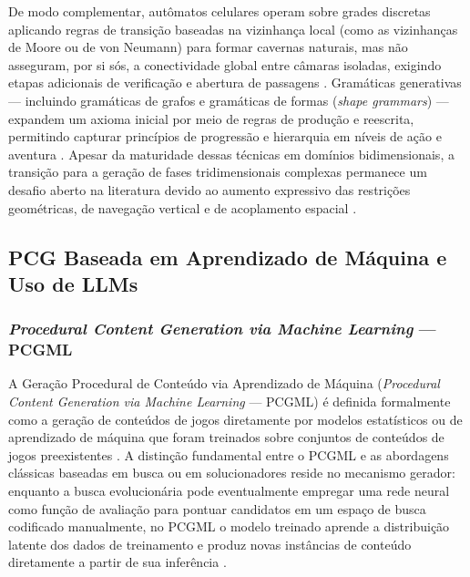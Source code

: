 De modo complementar, autômatos celulares operam sobre grades discretas aplicando regras de transição baseadas na vizinhança local (como as vizinhanças de Moore ou de von Neumann) para formar cavernas naturais, mas não asseguram, por si sós, a conectividade global entre câmaras isoladas, exigindo etapas adicionais de verificação e abertura de passagens \cite{linden2014dungeons, shaker2016constructive}. Gramáticas generativas --- incluindo gramáticas de grafos e gramáticas de formas (\textit{shape grammars}) --- expandem um axioma inicial por meio de regras de produção e reescrita, permitindo capturar princípios de progressão e hierarquia em níveis de ação e aventura \cite{dormans2010, inproceedings, shaker2016constructive}. Apesar da maturidade dessas técnicas em domínios bidimensionais, a transição para a geração de fases tridimensionais complexas permanece um desafio aberto na literatura devido ao aumento expressivo das restrições geométricas, de navegação vertical e de acoplamento espacial \cite{linden2014dungeons, maleki2024procedural, xu2025constraint}.

\subsection{PCG Baseada em Aprendizado de Máquina e Uso de LLMs}
\label{sec:pcgml_llms}

\subsubsection{\textit{Procedural Content Generation via Machine Learning} --- PCGML}
\label{sec:pcgml}

A Geração Procedural de Conteúdo via Aprendizado de Máquina (\textit{Procedural Content Generation via Machine Learning} --- PCGML) é definida formalmente como a geração de conteúdos de jogos diretamente por modelos estatísticos ou de aprendizado de máquina que foram treinados sobre conjuntos de conteúdos de jogos preexistentes \cite{summerville2018procedural}. A distinção fundamental entre o PCGML e as abordagens clássicas baseadas em busca ou em solucionadores reside no mecanismo gerador: enquanto a busca evolucionária pode eventualmente empregar uma rede neural como função de avaliação para pontuar candidatos em um espaço de busca codificado manualmente, no PCGML o modelo treinado aprende a distribuição latente dos dados de treinamento e produz novas instâncias de conteúdo diretamente a partir de sua inferência \cite{summerville2018procedural}.

